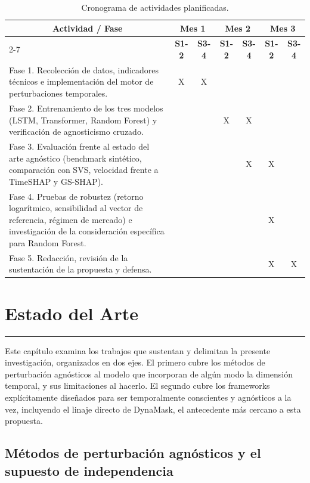 \begin{table}[h!]
\centering
\caption{Cronograma de actividades planificadas.}
\label{tab:cronograma}
\begin{tabular}{|p{6.5cm}|c|c|c|c|c|c|}
\hline
\multicolumn{1}{|c|}{\textbf{Actividad / Fase}} & \multicolumn{2}{c|}{\textbf{Mes 1}} & \multicolumn{2}{c|}{\textbf{Mes 2}} & \multicolumn{2}{c|}{\textbf{Mes 3}} \\ \cline{2-7}
\multicolumn{1}{|c|}{} & \textbf{S1-2} & \textbf{S3-4} & \textbf{S1-2} & \textbf{S3-4} & \textbf{S1-2} & \textbf{S3-4} \\ \hline
Fase 1. Recolección de datos, indicadores técnicos e implementación del motor de perturbaciones temporales. & X & X & & & & \\ \hline
Fase 2. Entrenamiento de los tres modelos (LSTM, Transformer, Random Forest) y verificación de agnosticismo cruzado. & & & X & X & & \\ \hline
Fase 3. Evaluación frente al estado del arte agnóstico (benchmark sintético, comparación con SVS, velocidad frente a TimeSHAP y GS-SHAP). & & & & X & X & \\ \hline
Fase 4. Pruebas de robustez (retorno logarítmico, sensibilidad al vector de referencia, régimen de mercado) e investigación de la consideración específica para Random Forest. & & & & & X & \\ \hline
Fase 5. Redacción, revisión de la sustentación de la propuesta y defensa. & & & & & X & X \\ \hline
\end{tabular}
\end{table}


\chapter{Estado del Arte}
\hrule \bigskip \vspace*{1cm}

\label{sec:estadoarte}

Este capítulo examina los trabajos que sustentan y delimitan la presente investigación, organizados en dos ejes. El primero cubre los métodos de perturbación agnósticos al modelo que incorporan de algún modo la dimensión temporal, y sus limitaciones al hacerlo. El segundo cubre los frameworks explícitamente diseñados para ser temporalmente conscientes y agnósticos a la vez, incluyendo el linaje directo de DynaMask, el antecedente más cercano a esta propuesta.

\section{Métodos de perturbación agnósticos y el supuesto de independencia}

